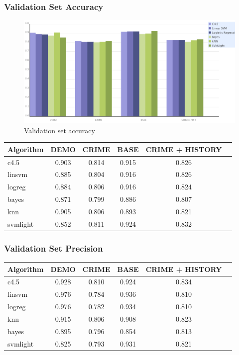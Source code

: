 \documentclass[11pt,letter]{article}
\begin{document}
\subsubsection{Validation Set Accuracy}

\begin{figure}
	\centering
	\includegraphics[scale=0.4]{report_figures/val_accuracy_bar.png}
	\caption{Validation set accuracy}
\end{figure}

\begin{tabular}{|l|c|c|c|c|c|}
\hline
Algorithm & DEMO & CRIME & BASE & CRIME + HISTORY\\
\hline
c4.5     & 0.903 & 0.814 & 0.915 & 0.826 \\
linsvm   & 0.885 & 0.804 & 0.916 & 0.826 \\
logreg   & 0.884 & 0.806 & 0.916 & 0.824 \\
bayes    & 0.871 & 0.799 & 0.886 & 0.807 \\
knn   & 0.905 & 0.806 & 0.893 & 0.821 \\
svmlight & 0.852 & 0.811 & 0.924 & 0.832 \\
\hline
\end{tabular}

\subsubsection{Validation Set Precision}

\begin{tabular}{|l|c|c|c|c|c|}
\hline
Algorithm & DEMO & CRIME & BASE & CRIME + HISTORY\\
\hline
c4.5     & 0.928 & 0.810 & 0.924 & 0.834 \\
linsvm   & 0.976 & 0.784 & 0.936 & 0.810 \\
logreg   & 0.976 & 0.782 & 0.934 & 0.810 \\
knn   & 0.915 & 0.806 & 0.908 & 0.823 \\
bayes    & 0.895 & 0.796 & 0.854 & 0.813 \\
svmlight & 0.825 & 0.793 & 0.931 & 0.821 \\
\hline
\end{tabular}
\end{document}
